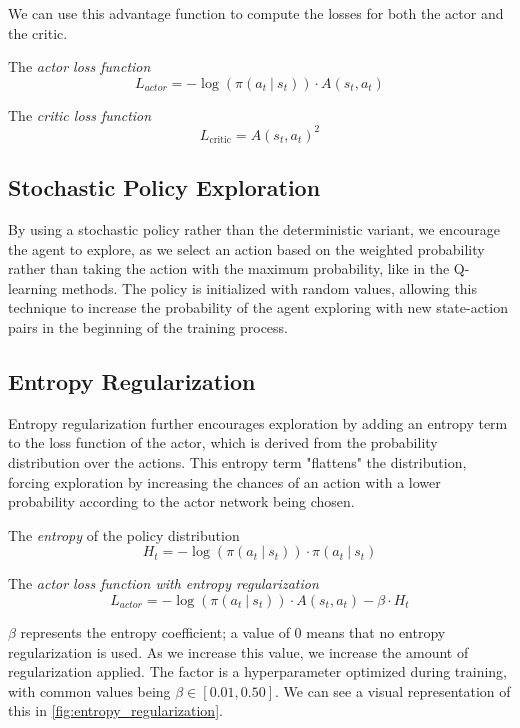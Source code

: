 We can use this advantage function to compute the losses for both the actor and
the critic.

\begin{definition}
  The \textit{actor loss function}
  $$L_{actor}=-\log (\pi(a_t~|~s_t)) \cdot A(s_t, a_t)$$
\end{definition}

\begin{definition}
  The \textit{critic loss function}
  $$L_{\text{critic}} = A(s_t, a_t)^2$$
\end{definition}

\subsection{Stochastic Policy Exploration}
By using a stochastic policy rather than the deterministic variant, we
encourage the agent to explore, as we select an action based on the weighted
probability rather than taking the action with the maximum probability, like in
the Q-learning methods. The policy is initialized with random values, allowing
this technique to increase the probability of the agent exploring with new
state-action pairs in the beginning of the training process.

\subsection{Entropy Regularization} \label{sec:entropy_regularization}
Entropy regularization further encourages exploration by adding an entropy term
to the loss function of the actor, which is derived from the probability
distribution over the actions. This entropy term "flattens" the distribution,
forcing exploration by increasing the chances of an action with a lower
probability according to the actor network being chosen.

\begin{definition}
  The \textit{entropy} of the policy distribution
  $$H_t=-\log(\pi(a_t~|~s_t)) \cdot \pi(a_t~|~s_t)$$
\end{definition}

\begin{definition}
  The \textit{actor loss function with entropy regularization}
  $$L_{actor}=-\log (\pi(a_t~|~s_t)) \cdot A(s_t, a_t) - \beta\cdot H_t$$
\end{definition}

$\beta$ represents the entropy coefficient; a value of 0 means that no entropy regularization is used. As we increase this value, we increase the amount of regularization applied. The factor
is a hyperparameter optimized during training, with common values being
$\beta\in[0.01,0.50]$. We can see a visual representation of this in \autoref{fig:entropy_regularization}.

